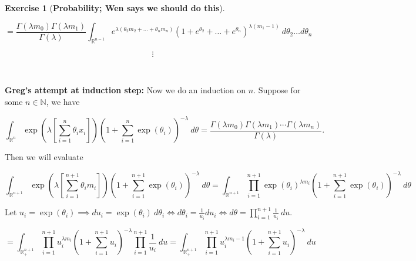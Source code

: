 \documentclass{article}
\theoremstyle{definition}
\newtheorem{exercise}{Exercise}
\theoremstyle{definition}
\theoremstyle{definition}
\theoremstyle{definition}
\begin{document}
\begin{exercise}[\textbf{Probability; Wen says we should do this}]
\begin{enumerate}[(a)]
\[
 =  \frac{\Gamma(\lambda m_0)\Gamma(\lambda m_1)}{\Gamma(\lambda)}  \int_{\mathbb{R}^{n-1}} e^{\lambda(\theta_2 m_2 + \ldots + \theta_n m_n)}  \left( 1 + e^{\theta_2} + \ldots + e^{\theta_n} \right)^{\lambda(m_1 - 1)}  \ d\theta_2 \ldots d \theta_n 
\]

\[
\vdots
\]



\


\textbf{Greg's attempt at induction step:} Now we do an induction on \(n\). Suppose for some \(n \in \mathbb{N}\), we have

\begin{equation}\label{2017.screen.3.a.inductive.hypothesis}
\int_{\mathbb{R}^n} \exp \left( \lambda \left[ \sum_{i=1}^n \theta_i x_i \right] \right) \left(1 + \sum_{i=1}^n \exp(\theta_i) \right)^{-\lambda} \ d\theta = \frac{\Gamma(\lambda m_0) \Gamma(\lambda m_1) \cdots \Gamma(\lambda m_n)}{\Gamma(\lambda)}.
\end{equation}

Then we will evaluate

\[
\int_{\mathbb{R}^{n+1}} \exp \left( \lambda \left[ \sum_{i=1}^{n+1} \theta_i m_i \right] \right) \left(1 + \sum_{i=1}^{n+1} \exp(\theta_i) \right)^{-\lambda} \ d\theta  
= \int_{\mathbb{R}^{n+1}} \prod_{i=1}^{n+1} \exp(\theta_i)^{\lambda m_i}  \left(1 + \sum_{i=1}^{n+1} \exp(\theta_i) \right)^{-\lambda} \ d\theta 
\]


Let \(u_i=  \exp(\theta_i) \implies du_i =\exp(\theta_i) \ d\theta_i \iff d\theta_i = \frac{1}{u_i} du_i \iff d\theta=  \prod_{i=1}^{n+1}\frac{1}{u_i} \ du    \).


\[
= \int_{\mathbb{R}^{n+1}_+} \prod_{i=1}^{n+1} u_i^{\lambda m_i}  \left(1 + \sum_{i=1}^{n+1} u_i \right)^{-\lambda} \prod_{i=1}^{n+1}\frac{1}{u_i} \ du = \int_{\mathbb{R}_+^{n+1}} \prod_{i=1}^{n+1} u_i^{\lambda m_i - 1}  \left(1 + \sum_{i=1}^{n+1} u_i \right)^{-\lambda}  \ du
\]


\end{enumerate}
\end{exercise}
\end{document}
